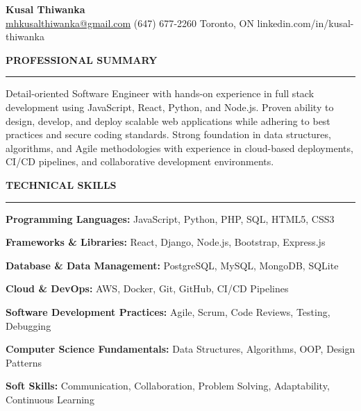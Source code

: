 \documentclass[10pt,letterpaper]{article}
\begin{document}
\begin{center}
{\LARGE\textbf{Kusal Thiwanka}}\\[3pt]
\href{mailto:mhkusalthiwanka@gmail.com}{mhkusalthiwanka@gmail.com}\hspace{2em}%
(647) 677{-}2260\hspace{2em}%
Toronto, ON\hspace{2em}
linkedin.com/in/kusal-thiwanka
\end{center}

\vspace{6pt}

\textbf{PROFESSIONAL SUMMARY}\\[-8pt]
\noindent\rule{\textwidth}{1pt}

\vspace{-2pt}

Detail-oriented Software Engineer with hands-on experience in full stack development using JavaScript, React, Python, and Node.js. Proven ability to design, develop, and deploy scalable web applications while adhering to best practices and secure coding standards. Strong foundation in data structures, algorithms, and Agile methodologies with experience in cloud-based deployments, CI/CD pipelines, and collaborative development environments.

\vspace{8pt}

\textbf{TECHNICAL SKILLS}\\[-8pt]
\noindent\rule{\textwidth}{1pt}

\vspace{-2pt}

\textbf{Programming Languages:} JavaScript, Python, PHP, SQL, HTML5, CSS3

\textbf{Frameworks \& Libraries:} React, Django, Node.js, Bootstrap, Express.js

\textbf{Database \& Data Management:} PostgreSQL, MySQL, MongoDB, SQLite

\textbf{Cloud \& DevOps:} AWS, Docker, Git, GitHub, CI/CD Pipelines

\textbf{Software Development Practices:} Agile, Scrum, Code Reviews, Testing, Debugging

\textbf{Computer Science Fundamentals:} Data Structures, Algorithms, OOP, Design Patterns

\textbf{Soft Skills:} Communication, Collaboration, Problem Solving, Adaptability, Continuous Learning

\vspace{8pt}
\end{document}
